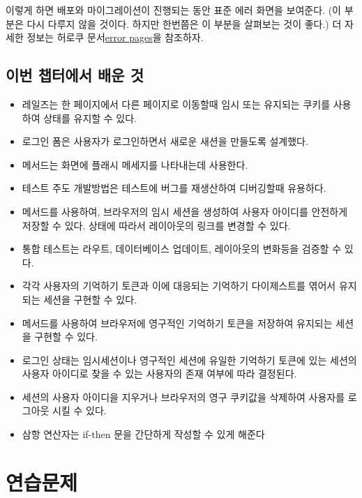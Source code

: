 {{\noindent 이렇게 하면 배포와 마이그레이션이 진행되는 동안 표준 에러 화면을 보여준다. (이 부분은 다시 다루지 않을 것이다. 하지만 한번쯤은 이 부분을 살펴보는 것이 좋다.) 더 자세한 정보는 허로쿠 문서\href{https://devcenter.heroku.com/articles/error-pages}{error pages}을 참조하자. 

\subsection{이번 챕터에서 배운 것} \label{sec:log_in_out_what_we_learned_in_this_chapter} 

\begin{itemize} \item 레일즈는 한 페이지에서 다른 페이지로 이동할때 임시 또는 유지되는 쿠키를 사용하여 상태를 유지할 수 있다. \item 로그인 폼은 사용자가 로그인하면서 새로운 새션을 만들도록 설계했다. \item {} 메서드는 화면에 플래시 메세지를 나타내는데 사용한다. \item 테스트 주도 개발방법은 테스트에 버그를 재생산하여 디버깅할때 유용하다. \item {} 메서드를 사용하여, 브라우저의 임시 세션을 생성하여 사용자 아이디를 안전하게 저장할 수 있다.  상태에 따라서 레이아웃의 링크를 변경할 수 있다. \item 통합 테스트는 라우트, 데이터베이스 업데이트, 레이아웃의 변화등을 검증할 수 있다. \item 각각 사용자의 기억하기 토큰과 이에 대응되는 기억하기 다이제스트를 엮어서 유지되는 세션을 구현할 수 있다. \item {} 메서드를 사용하여 브라우저에 영구적인 기억하기 토큰을 저장하여 유지되는 세션을 구현할 수 있다. \item 로그인 상태는 임시세션이나 영구적인 세션에 유일한 기억하기 토큰에 있는 세션의 사용자 아이디로 찾을 수 있는 사용자의 존재 여부에 따라 결정된다. \item 세션의 사용자 아이디을 지우거나 브라우저의 영구 쿠키값을 삭제하여 사용자를 로그아웃 시킬 수 있다. \item 삼항 연산자는 if-then 문을 간단하게 작성할 수 있게 해준다 \end{itemize} 

\section{연습문제} \label{sec:log_in_out_exercises} 

}}
